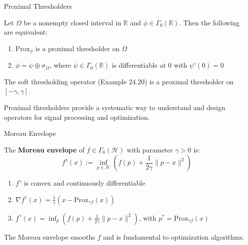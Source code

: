 \documentclass[aspectratio=169,10pt]{beamer}
\begin{document}
\begin{frame}{Proximal Thresholders}
\begin{theorem}
Let $\Omega$ be a nonempty closed interval in $\mathbb{R}$ and $\phi \in \Gamma_0(\mathbb{R})$. Then the following are equivalent:
\begin{enumerate}
    \item $\mathrm{Prox}_\phi$ is a proximal thresholder on $\Omega$
    \item $\phi = \psi \oplus \sigma_\Omega$, where $\psi \in \Gamma_0(\mathbb{R})$ is differentiable at 0 with $\psi'(0) = 0$
\end{enumerate}
\end{theorem}

\vspace{0.3cm}

\begin{example}
The soft thresholding operator (Example 24.20) is a proximal thresholder on $[-\gamma, \gamma]$.
\end{example}

\vspace{0.3cm}

Proximal thresholders provide a systematic way to understand and design operators for signal processing and optimization.
\end{frame}

\begin{frame}{Moreau Envelope}
\begin{definition}
The \textbf{Moreau envelope} of $f \in \Gamma_0(\mathcal{H})$ with parameter $\gamma > 0$ is:
\[
f^\gamma(x) := \inf_{p \in \mathcal{H}}\left(f(p) + \frac{1}{2\gamma}\|p - x\|^2\right)
\]
\end{definition}

\vspace{0.3cm}

\begin{properties}
\begin{enumerate}
    \item $f^\gamma$ is convex and continuously differentiable
    \item $\nabla f^\gamma(x) = \frac{1}{\gamma}(x - \mathrm{Prox}_{\gamma f}(x))$
    \item $f^\gamma(x) = \inf_p (f(p) + \frac{1}{2\gamma}\|p - x\|^2)$, with $p^* = \mathrm{Prox}_{\gamma f}(x)$
\end{enumerate}
\end{properties}

\vspace{0.3cm}

The Moreau envelope smooths $f$ and is fundamental to optimization algorithms.
\end{frame}
\end{document}
